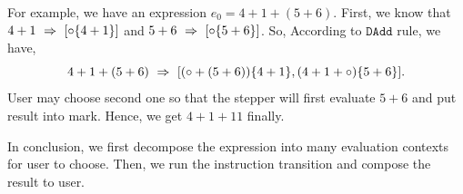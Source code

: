 For example, we have an expression $e_0 = 4 + 1 + (5 + 6)$. First, we know that $4 + 1 ~\Rightarrow~ [\circ \{4 + 1\}]$ and $5 + 6 ~\Rightarrow~ [\circ \{5 + 6\}]$. So, According to $\mathtt{DAdd}$ rule, we have,
$$
4 + 1 + (5 + 6) ~\Rightarrow~ [(\circ + (5 + 6)) \{4 + 1\}, (4 + 1 + \circ) \{5 + 6\}].
$$
User may choose second one so that the stepper will first evaluate $5 + 6$ and put result into mark. Hence, we get $4 + 1+ 11$ finally.

In conclusion, we first decompose the expression into many evaluation contexts for user to choose. Then, we run the instruction transition and compose the result to user. 
